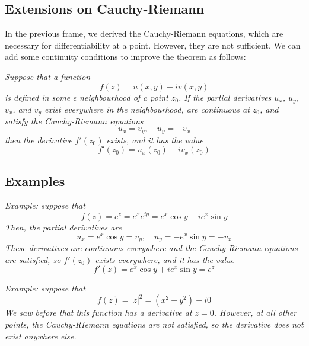\documentclass{article}
\begin{document}
\subsection{Extensions on Cauchy-Riemann}
In the previous frame, we derived the Cauchy-Riemann equations, which are necessary for differentiability at a point. However, they are not sufficient. We can add some continuity conditions to improve the theorem as follows:

\textit{Suppose that a function
\[
	f(z) = u(x, y) + iv(x, y)
\]
is defined in some $\epsilon$ neighbourhood of a point $z_0$. If the partial derivatives $u_x$, $u_y$, $v_x$, and $v_y$ exist everywhere in the neighbourhood, are continuous at $z_0$, and satisfy the Cauchy-Riemann equations
\[
	u_x = v_y,	\quad	u_y = -v_x
\]	
then the derivative $f'(z_0)$ exists, and it has the value
\[
	f'(z_0) = u_x(z_0) + iv_x(z_0)
\]}

\subsection{Examples}
\textit{Example: suppose that
\[
	f(z) = e^z = e^x e^{iy} = e^x \cos y + ie^x \sin y
\]
Then, the partial derivatives are
\[
	u_x = e^x \cos y = v_y,	\quad	u_y = -e^x \sin y = -v_x
\]
These derivatives are continuous everywhere and the Cauchy-Riemann equations are satisfied, so $f'(z_0)$ exists everywhere, and it has the value
\[
	f'(z) = e^x \cos y + ie^x \sin y = e^z
\]}

\textit{Example: suppose that
\[
	f(z) = |z|^2 = (x^2 + y^2) + i0
\]
We saw before that this function has a derivative at $z = 0$. However, at all other points, the Cauchy-RIemann equations are not satisfied, so the derivative does not exist anywhere else.}
\end{document}
